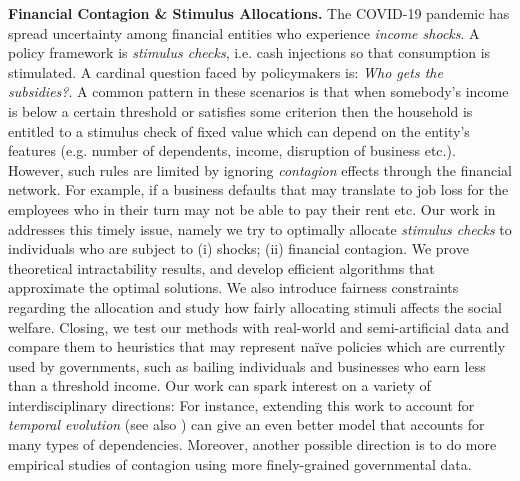 \documentclass[11pt]{article}
\begin{document}
\noindent \textbf{Financial Contagion \& Stimulus Allocations.} The COVID-19 pandemic has spread uncertainty among financial entities who experience \emph{income shocks}. A policy framework is \emph{stimulus checks}, i.e. cash injections so that consumption is stimulated. A cardinal question faced by policymakers is: \emph{Who gets the subsidies?}. 
A common pattern in these scenarios is that when somebody's income is below a certain threshold or satisfies some criterion then the household is entitled to a stimulus check of fixed value which can depend on the entity's features (e.g. number of dependents, income, disruption of business etc.). However, such rules are limited by ignoring \emph{contagion} effects through the financial network. For example, if a business defaults that may translate to job loss for the employees who in their turn may not be able to pay their rent etc. Our work in \cite{papachristou2021allocating} addresses this timely issue, namely we try to optimally allocate \emph{stimulus checks} to individuals who are subject to (i) shocks; (ii) financial contagion. We prove theoretical intractability results, and develop efficient algorithms that approximate the  optimal solutions. We also introduce fairness constraints regarding the allocation and study how fairly allocating stimuli affects the social welfare. 
Closing, we test our methods with real-world and semi-artificial data and compare them to heuristics that may represent na\"ive policies which are currently used by governments, such as bailing individuals and businesses who earn less than a threshold income.
Our work can spark interest on a variety of interdisciplinary directions: For instance, extending this work to account for \emph{temporal evolution} (see also \cite{abebe2020subsidy}) can give an even better model that accounts for many types of dependencies.
Moreover, another possible direction is to do more empirical studies of contagion using more finely-grained governmental data.

\end{document}
